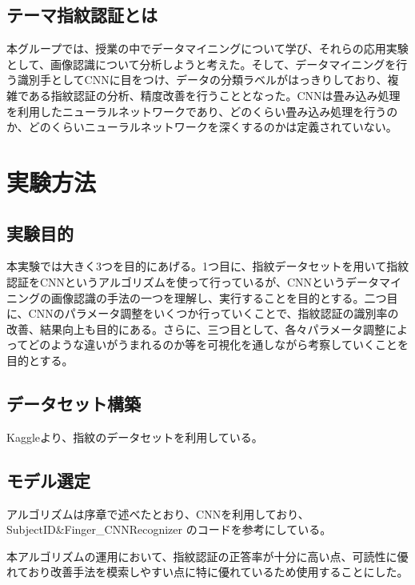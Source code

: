 \documentclass[a4paper, 11pt, titlepage]{jsarticle}
\begin{document}
\subsection{テーマ指紋認証とは}
本グループでは、授業の中でデータマイニングについて学び、それらの応用実験として、画像認識について分析しようと考えた。そして、データマイニングを行う識別手としてCNNに目をつけ、データの分類ラベルがはっきりしており、複雑である指紋認証の分析、精度改善を行うこととなった。CNNは畳み込み処理を利用したニューラルネットワークであり、どのくらい畳み込み処理を行うのか、どのくらいニューラルネットワークを深くするのかは定義されていない。


\section{実験方法}


\subsection{実験目的}
本実験では大きく3つを目的にあげる。1つ目に、指紋データセットを用いて指紋認証をCNNというアルゴリズムを使って行っているが、CNNというデータマイニングの画像認識の手法の一つを理解し、実行することを目的とする。二つ目に、CNNのパラメータ調整をいくつか行っていくことで、指紋認証の識別率の改善、結果向上も目的にある。さらに、三つ目として、各々パラメータ調整によってどのような違いがうまれるのか等を可視化を通しながら考察していくことを目的とする。


\subsection{データセット構築}
Kaggleより、指紋のデータセット\cite{cnn}を利用している。

\subsection{モデル選定}
アルゴリズムは序章で述べたとおり、CNNを利用しており、SubjectID\&Finger\_CNNRecognizer
\cite{algorithm}のコードを参考にしている。

本アルゴリズムの運用において、指紋認証の正答率が十分に高い点、可読性に優れており改善手法を模索しやすい点に特に優れているため使用することにした。
\end{document}
